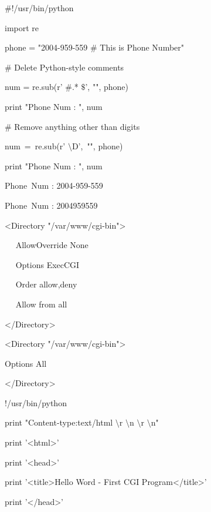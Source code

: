 \begin {enumerate}
\begin {enumerate}
\noindent
 $  \#  $!/usr/bin/python \par
\noindent
import re \par
\vspace{12pt}
\noindent
phone = "2004-959-559  $  \#  $ This is Phone Number" \par
\vspace{12pt}
\noindent
 $  \#  $ Delete Python-style comments \par
\noindent
num = re.sub(r' $  \#  $.* $  \$  $', "", phone) \par
\noindent
print "Phone Num : ", num \par
\vspace{12pt}
\noindent
 $  \#  $ Remove anything other than digits \par
\noindent
num~=~re.sub(r' $  \setminus  $D',~"", phone)     \par
\noindent
print "Phone Num : ", num \par
\vspace{12pt}
\noindent
Phone~Num :  2004-959-559 \par
\noindent
Phone~Num :  2004959559 \par
\vspace{12pt}
\noindent
<Directory "/var/www/cgi-bin"> \par
\noindent
~~ AllowOverride None \par
\noindent
~~ Options ExecCGI \par
\noindent
~~ Order allow,deny \par
\noindent
~~ Allow from all \par
\noindent
</Directory> \par
\vspace{12pt}
\noindent
<Directory "/var/www/cgi-bin"> \par
\noindent
Options All \par
\noindent
</Directory> \par
\vspace{12pt}
\noindent
!/usr/bin/python \par
\vspace{12pt}
\noindent
print "Content-type:text/html $  \setminus  $r $  \setminus  $n $  \setminus  $r $  \setminus  $n" \par
\noindent
print '<html>' \par
\noindent
print '<head>' \par
\noindent
print '<title>Hello Word - First CGI Program</title>' \par
\noindent
print '</head>' \par

\end{enumerate}
\end{enumerate}
